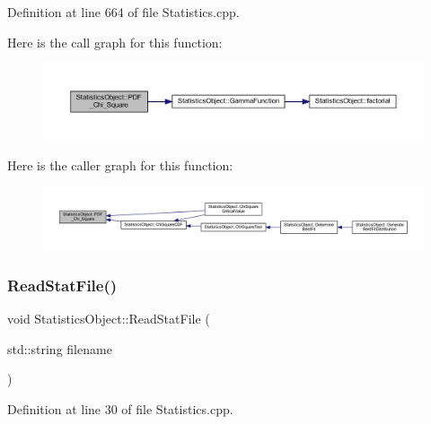 Definition at line 664 of file Statistics.\+cpp.

Here is the call graph for this function\+:\nopagebreak
\begin{figure}[H]
\begin{center}
\leavevmode
\includegraphics[width=350pt]{class_statistics_object_aec6848499139f4811fd4f2f60a252a9f_cgraph}
\end{center}
\end{figure}
Here is the caller graph for this function\+:\nopagebreak
\begin{figure}[H]
\begin{center}
\leavevmode
\includegraphics[width=350pt]{class_statistics_object_aec6848499139f4811fd4f2f60a252a9f_icgraph}
\end{center}
\end{figure}
\mbox{\label{class_statistics_object_a693fe5171d536953cc5545048716dcca}} 
\subsubsection{\texorpdfstring{Read\+Stat\+File()}{ReadStatFile()}}
{\footnotesize\ttfamily void Statistics\+Object\+::\+Read\+Stat\+File (\begin{DoxyParamCaption}\item[{std\+::string}]{filename }\end{DoxyParamCaption})}



Definition at line 30 of file Statistics.\+cpp.

